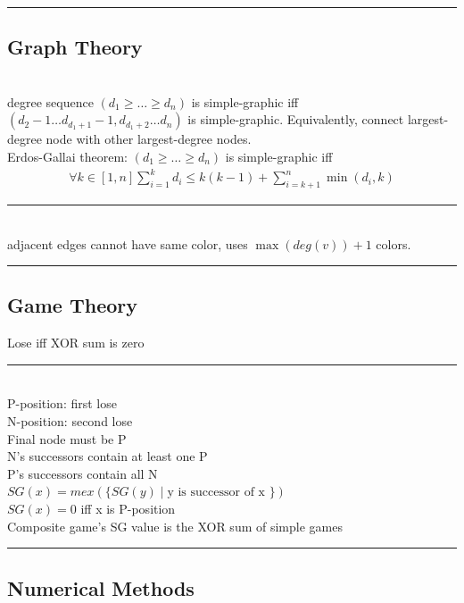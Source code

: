 \documentclass[10pt,letterpaper,landscape]{article}
\begin{document}
\begin{multicols}{2}
\noindent\rule{\linewidth}{1pt}

\subsection{Graph Theory}

 \\ degree sequence $(d_1 \ge \hdots \ge d_n)$ is simple-graphic iff $(d_2-1 \hdots d_{d_1+1}-1, d_{d_1+2} \hdots d_n)$ is simple-graphic. Equivalently, connect largest-degree node with other largest-degree nodes. \\
Erdos-Gallai theorem: $(d_1 \ge \hdots \ge d_n)$ is simple-graphic iff
\begin{align*}
	\forall k \in [1,n] \sum_{i=1}^{k}{d_i} \le k(k-1) + \sum_{i=k+1}^{n}{\min{(d_i, k)}}
\end{align*}

\noindent\rule{\linewidth}{1pt}

 \\ adjacent edges cannot have same color, uses $\max{(deg(v))} + 1$ colors. 

\noindent\rule{\linewidth}{1pt}

\subsection{Game Theory}

 Lose iff XOR sum is zero

\noindent\rule{\linewidth}{1pt}

 \\
P-position: first lose \\
N-position: second lose \\
Final node must be P \\
N's successors contain at least one P \\
P's successors contain all N \\
$SG(x) = mex(\{SG(y) \mid \text{y is successor of x }\})$ \\
$SG(x) = 0$ iff x is P-position \\
Composite game's SG value is the XOR sum of simple games

\noindent\rule{\linewidth}{1pt}

\subsection{Numerical Methods}


\end{multicols}
\end{document}
